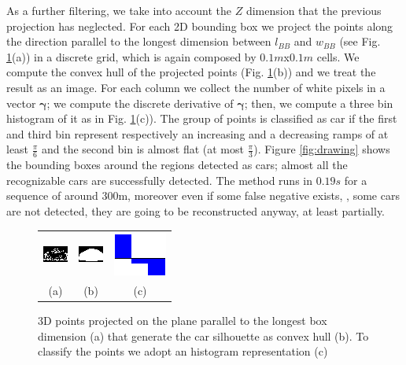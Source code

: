 As a further filtering, we take into account the $Z$ dimension that the previous projection has neglected.
For each 2D bounding box we project the points along the direction parallel to the longest dimension between $l_{BB}$ and $w_{BB}$ (see Fig. \ref{fig:convHull}(a)) in a discrete grid, which is again composed by $0.1m$x$0.1m$ cells.
We compute the convex hull of the projected points (Fig. \ref{fig:convHull}(b)) and we treat the result as an image. 
For each column we collect the number of white pixels in a vector $\mathbf{\gamma}$; we compute the discrete derivative of $\mathbf{\gamma}$; then, we compute a three bin histogram of it as in Fig. \ref{fig:convHull}(c)).
The group of points is classified as car if the first and third bin represent respectively an increasing and a decreasing ramps of at least $\frac{\pi}{6}$ and the second bin is almost flat (at most $\frac{\pi}{3}$). 
Figure \ref{fig:drawing} shows the bounding boxes around the regions detected as cars; almost all the recognizable cars are successfully detected.
The method runs in $0.19s$ for a sequence of around $300$m, moreover even if some false negative exists, \ie, some cars are not detected, they are going to be reconstructed anyway, at least partially.


\begin{figure}[tp]
    \centering
    \begin{tabular}{ccc}
        \includegraphics[width=0.3\columnwidth]{./img/ch-laser/CurProj.png}&
        \includegraphics[width=0.3\columnwidth]{./img/ch-laser/convHull.png}&
        \includegraphics[width=0.3\columnwidth]{./img/ch-laser/hist}\\
        (a)&(b)&(c)
    \end{tabular}
    \caption{3D points projected on the plane parallel to the longest box dimension (a) that generate the car silhouette as convex hull (b). To classify the points we adopt an histogram representation (c)}
    \label{fig:convHull}
\end{figure}

